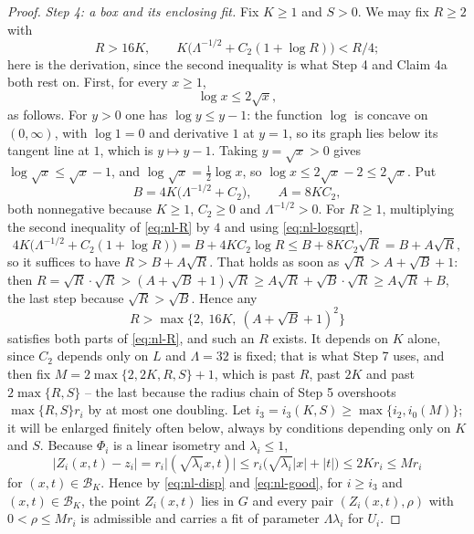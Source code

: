 \begin{proof}
\emph{Step 4: a box and its enclosing fit.}
Fix $K\ge1$ and $S>0$. We may fix $R\ge2$ with
\begin{equation}\label{eq:nl-R}
  R>16K,\qquad
  K\bigl(\Lambda^{-1/2}+C_2(1+\log R)\bigr)<R/4 ;
\end{equation}
here is the derivation, since the second inequality is what Step 4 and Claim 4a both
rest on. First, for every $x\ge1$,
\begin{equation}\label{eq:nl-logsqrt}
  \log x\le2\sqrt x ,
\end{equation}
as follows. For $y>0$ one has $\log y\le y-1$: the function $\log$ is concave on
$(0,\infty)$, with $\log1=0$ and derivative $1$ at $y=1$, so its graph lies below its
tangent line at $1$, which is $y\mapsto y-1$. Taking $y=\sqrt x>0$ gives
$\log\sqrt x\le\sqrt x-1$, and $\log\sqrt x=\tfrac12\log x$, so
$\log x\le2\sqrt x-2\le2\sqrt x$. Put
\[
  B=4K\bigl(\Lambda^{-1/2}+C_2\bigr),\qquad A=8KC_2 ,
\]
both nonnegative because $K\ge1$, $C_2\ge0$ and $\Lambda^{-1/2}>0$. For $R\ge1$,
multiplying the second inequality of \eqref{eq:nl-R} by $4$ and using
\eqref{eq:nl-logsqrt},
\[
  4K\bigl(\Lambda^{-1/2}+C_2(1+\log R)\bigr)=B+4KC_2\log R
    \le B+8KC_2\sqrt R=B+A\sqrt R ,
\]
so it suffices to have $R>B+A\sqrt R$. That holds as soon as
$\sqrt R>A+\sqrt B+1$: then
$R=\sqrt R\cdot\sqrt R>(A+\sqrt B+1)\sqrt R\ge A\sqrt R+\sqrt B\cdot\sqrt R
\ge A\sqrt R+B$, the last step because $\sqrt R>\sqrt B$. Hence any
\[
  R>\max\bigl\{2,\ 16K,\ (A+\sqrt B+1)^2\bigr\}
\]
satisfies both parts of \eqref{eq:nl-R}, and such an $R$ exists. It depends on $K$
alone, since $C_2$ depends only on $L$ and $\Lambda=32$ is fixed; that is what
Step 7 uses,
and then fix $M=2\max\{2,2K,R,S\}+1$, which is past $R$, past $2K$ and past
$2\max\{R,S\}$ -- the last because the radius chain of Step 5 overshoots
$\max\{R,S\}r_i$ by at most one doubling. Let $i_3=i_3(K,S)\ge\max\{i_2,i_0(M)\}$;
it will be enlarged finitely often below, always by conditions depending only on
$K$ and $S$. Because $\Phi_i$ is a linear isometry and $\lambda_i\le1$,
\begin{equation}\label{eq:nl-disp}
  |Z_i(x,t)-z_i|=r_i\bigl|(\sqrt{\lambda_i}x,t)\bigr|
     \le r_i\bigl(\sqrt{\lambda_i}|x|+|t|\bigr)\le2Kr_i\le Mr_i
\end{equation}
for $(x,t)\in\mathcal B_K$. Hence by \eqref{eq:nl-disp} and \eqref{eq:nl-good}, for
$i\ge i_3$ and $(x,t)\in\mathcal B_K$, the point $Z_i(x,t)$ lies in $G$ and every pair
$(Z_i(x,t),\rho)$ with $0<\rho\le Mr_i$ is admissible and carries a fit of
parameter $\Lambda\lambda_i$ for $U_i$.


\end{proof}
